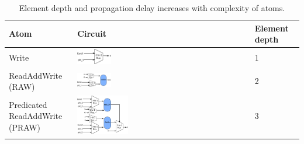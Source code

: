 \begin{table}[!t]
  \begin{scriptsize}
    \begin{tabular}{|p{}|p{}|p{}|}
  \hline
  Atom & Circuit & Element depth \\
  \hline
  Write & \includegraphics[width=0.2\textwidth]{rw.pdf} & 1 \\
  \hline
  ReadAddWrite (RAW) & \includegraphics[width=0.2\textwidth]{raw.pdf} & 2\\
  \hline
  \pbox{0.1\textwidth}
  {Predicated\\
  ReadAddWrite\\(PRAW)} & \includegraphics[width=0.3\textwidth]{pred_raw.pdf}  & 3\\
  \hline
  \end{tabular}
\end{scriptsize}
\caption{Element depth and propagation delay increases with complexity of atoms.}
  \label{fig:element_depth}
\end{table}

